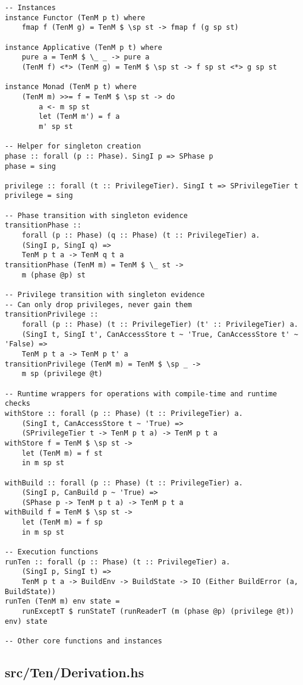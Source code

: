 \documentclass{article}
\begin{document}
\begin{tcolorbox}[title=Ten/Core.hs Changes]
\begin{verbatim}
-- Instances
instance Functor (TenM p t) where
    fmap f (TenM g) = TenM $ \sp st -> fmap f (g sp st)

instance Applicative (TenM p t) where
    pure a = TenM $ \_ _ -> pure a
    (TenM f) <*> (TenM g) = TenM $ \sp st -> f sp st <*> g sp st

instance Monad (TenM p t) where
    (TenM m) >>= f = TenM $ \sp st -> do
        a <- m sp st
        let (TenM m') = f a
        m' sp st

-- Helper for singleton creation
phase :: forall (p :: Phase). SingI p => SPhase p
phase = sing

privilege :: forall (t :: PrivilegeTier). SingI t => SPrivilegeTier t
privilege = sing

-- Phase transition with singleton evidence
transitionPhase ::
    forall (p :: Phase) (q :: Phase) (t :: PrivilegeTier) a.
    (SingI p, SingI q) =>
    TenM p t a -> TenM q t a
transitionPhase (TenM m) = TenM $ \_ st ->
    m (phase @p) st

-- Privilege transition with singleton evidence
-- Can only drop privileges, never gain them
transitionPrivilege ::
    forall (p :: Phase) (t :: PrivilegeTier) (t' :: PrivilegeTier) a.
    (SingI t, SingI t', CanAccessStore t ~ 'True, CanAccessStore t' ~ 'False) =>
    TenM p t a -> TenM p t' a
transitionPrivilege (TenM m) = TenM $ \sp _ ->
    m sp (privilege @t)

-- Runtime wrappers for operations with compile-time and runtime checks
withStore :: forall (p :: Phase) (t :: PrivilegeTier) a.
    (SingI t, CanAccessStore t ~ 'True) =>
    (SPrivilegeTier t -> TenM p t a) -> TenM p t a
withStore f = TenM $ \sp st ->
    let (TenM m) = f st
    in m sp st

withBuild :: forall (p :: Phase) (t :: PrivilegeTier) a.
    (SingI p, CanBuild p ~ 'True) =>
    (SPhase p -> TenM p t a) -> TenM p t a
withBuild f = TenM $ \sp st ->
    let (TenM m) = f sp
    in m sp st

-- Execution functions
runTen :: forall (p :: Phase) (t :: PrivilegeTier) a.
    (SingI p, SingI t) =>
    TenM p t a -> BuildEnv -> BuildState -> IO (Either BuildError (a, BuildState))
runTen (TenM m) env state =
    runExceptT $ runStateT (runReaderT (m (phase @p) (privilege @t)) env) state

-- Other core functions and instances
\end{verbatim}
\end{tcolorbox}

\subsection{src/Ten/Derivation.hs}
\end{document}
